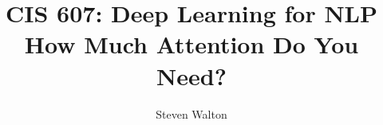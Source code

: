 \documentclass[12pt,letter]{article}
\begin{document}
\title{CIS 607: Deep Learning for NLP\\
    How Much Attention Do You Need?}
\author{Steven Walton}
\maketitle





\end{document}
